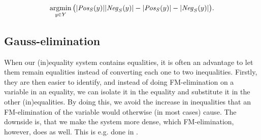 \[
\argmin_{y\in Y}\big(|\Pos_S(y)||\Neg_S(y)| - |\Pos_S(y)|-|\Neg_S(y)|\big).
\] 
%
%
%
\subsection{Gauss-elimination}
When our (in)equality system contains equalities, it is often an advantage to let them remain equalities instead of converting each one to two inequalities. Firstly, they are then easier to identify, and instead of doing FM-elimination on a variable in an equality, we can isolate it in the equality and substitute it in the other (in)equalities. By doing this, we avoid the increase in inequalities that an FM-elimination of the variable would otherwise (in most cases) cause. The downside is, that we make the system more dense, which FM-elimination, however, does as well. This is e.g. done in \cite{simon05}.

